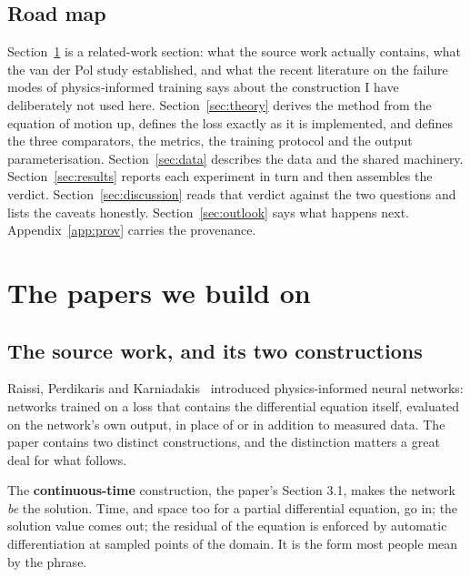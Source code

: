 \documentclass[11pt,a4paper]{article}
\begin{document}
\subsection{Road map}

Section~\ref{sec:papers} is a related-work section: what the source work
actually contains, what the van der Pol study established, and what the recent
literature on the failure modes of physics-informed training says about the
construction I have deliberately not used here.
Section~\ref{sec:theory} derives the method from the equation of motion up,
defines the loss exactly as it is implemented, and defines the three
comparators, the metrics, the training protocol and the output
parameterisation. Section~\ref{sec:data} describes the data and the shared
machinery. Section~\ref{sec:results} reports each experiment in turn and then
assembles the verdict. Section~\ref{sec:discussion} reads that verdict against
the two questions and lists the caveats honestly.
Section~\ref{sec:outlook} says what happens next. Appendix~\ref{app:prov}
carries the provenance.

\section{The papers we build on}
\label{sec:papers}

\subsection{The source work, and its two constructions}

Raissi, Perdikaris and Karniadakis~\cite{raissi2019} introduced physics-informed
neural networks: networks trained on a loss that contains the differential
equation itself, evaluated on the network's own output, in place of or in
addition to measured data. The paper contains two distinct constructions, and
the distinction matters a great deal for what follows.

The \textbf{continuous-time} construction, the paper's Section 3.1, makes the
network \emph{be} the solution. Time, and space too for a partial differential
equation, go in; the solution value comes out; the residual of the equation is
enforced by automatic differentiation at sampled points of the domain. It is the
form most people mean by the phrase.
\end{document}
